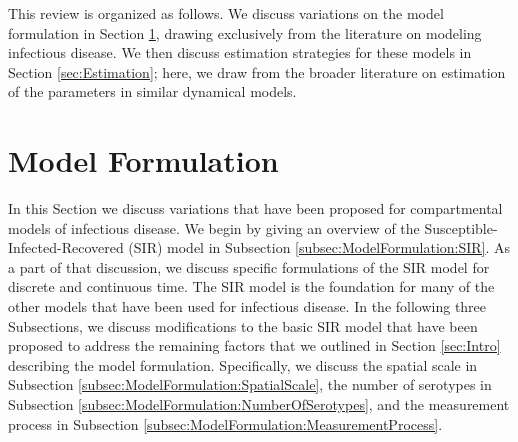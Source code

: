 \documentclass[fleqn]{article}\usepackage[]{graphicx}\usepackage[]{color}
\begin{document}
This review is organized as follows.  We discuss variations on the model formulation in Section \ref{sec:ModelFormulation}, drawing exclusively from the literature on modeling infectious disease.  We then discuss estimation strategies for these models in Section \ref{sec:Estimation}; here, we draw from the broader literature on estimation of the parameters in similar dynamical models.


\section{Model Formulation}
\label{sec:ModelFormulation}

In this Section we discuss variations that have been proposed for compartmental models of infectious disease.  We begin by giving an overview of the Susceptible-Infected-Recovered (SIR) model in Subsection \ref{subsec:ModelFormulation:SIR}.  As a part of that discussion, we discuss specific formulations of the SIR model for discrete and continuous time.  The SIR model is the foundation for many of the other models that have been used for infectious disease.  In the following three Subsections, we discuss modifications to the basic SIR model that have been proposed to address the remaining factors that we outlined in Section \ref{sec:Intro} describing the model formulation.  Specifically, we discuss the spatial scale in Subsection \ref{subsec:ModelFormulation:SpatialScale}, the number of serotypes in Subsection \ref{subsec:ModelFormulation:NumberOfSerotypes}, and the measurement process in Subsection \ref{subsec:ModelFormulation:MeasurementProcess}.
\end{document}

